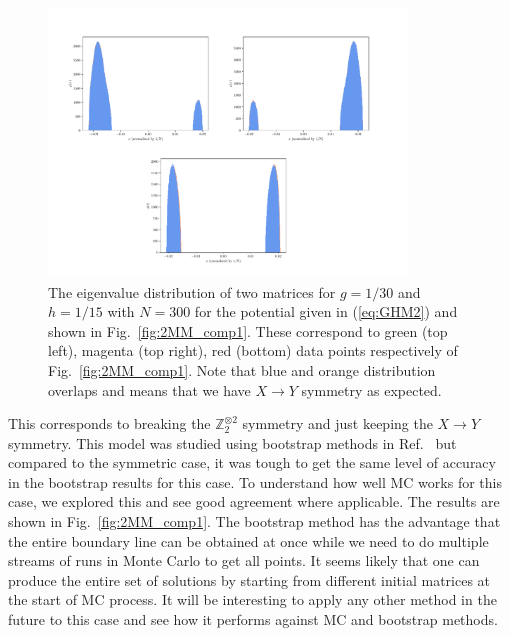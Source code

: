 \documentclass[letter,11pt]{article}
\begin{document}
\begin{figure}[htbp] 
	\centering 
	\includegraphics[width=0.85\textwidth]{figs/all_symb_ev.pdf}
	\caption{\label{fig:2MM_evd}The eigenvalue distribution of two matrices for $g=1/30$ and $h=1/15$ 
	with $N=300$ for the potential given in (\ref{eq:GHM2}) and shown in Fig.~\ref{fig:2MM_comp1}.
	These correspond to green (top left), magenta (top right), red (bottom) data points respectively of Fig.~\ref{fig:2MM_comp1}. Note that blue and orange distribution overlaps and means that we have $X \to Y$ symmetry as expected.}
\end{figure}
This corresponds to breaking the $\mathbb{Z}_{2}^{\otimes 2}$ symmetry and just keeping the $X \to Y$ symmetry. This model was studied using bootstrap methods in 
Ref.~\cite{Kazakov:2021lel} but compared to the symmetric case, it was tough to get the same level of accuracy in the bootstrap results for this case. To understand how well MC works for this case, we explored this and see good agreement where applicable. The results are shown in Fig.~\ref{fig:2MM_comp1}. The bootstrap method has the advantage that the entire boundary line can be obtained at once while we need to do multiple streams of runs in Monte Carlo to get all points. It seems likely that one can produce the entire set of solutions by starting from 
different initial matrices at the start of MC process. It will be interesting to apply any other method in the future to this case
and see how it performs against MC and bootstrap methods.  
\end{document}

